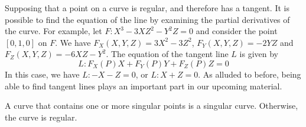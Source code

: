 Supposing that a point on a curve is regular, and therefore has a tangent.
It is possible to find the equation of the line by examining the partial derivatives of the curve.
For example, let $F: X^3 - 3XZ^2 - Y^2Z = 0$ and consider the point $[0,1,0]$ on $F$.
We have $F_X(X,Y,Z) = 3X^2 -3Z^2$, $F_Y(X,Y,Z) = -2YZ$ and $F_Z(X,Y,Z) = -6XZ - Y^2$.
The equation of the tangent line $L$ is given by
$$L : F_X(P)X + F_Y(P)Y + F_Z(P)Z = 0$$
In this case, we have $L : -X - Z = 0$, or $L: X + Z = 0$.
As alluded to before, being able to find tangent lines plays an important part in our upcoming material.

\begin{definition}
	A curve that contains one or more singular points is a singular curve. Otherwise, the curve is regular.
\end{definition}
